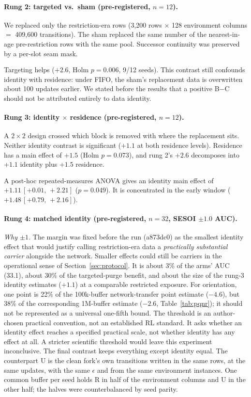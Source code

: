 \documentclass[10pt]{article} %
\newcommand{\ci}[2]{\,[#1,\,#2]}
\begin{document}
\paragraph{Rung 2: targeted vs.\ sham (pre-registered, $n=12$).}
We replaced only the restriction-era rows (3{,}200 rows $\times$ 128 environment columns $=$ 409{,}600 transitions). The sham replaced the same number of the nearest-in-age pre-restriction rows with the same pool. Successor continuity was preserved by a per-slot seam mask.

Targeting helps ($+2.6$, Holm $p=0.006$, 9/12 seeds). This contrast still confounds identity with residence: under FIFO, the sham's replacement data is overwritten about 100 updates earlier. We stated before the results that a positive B$-$C should not be attributed entirely to data identity.

\paragraph{Rung 3: identity $\times$ residence (pre-registered, $n=12$).}
A $2\times2$ design crossed which block is removed with where the replacement sits. Neither identity contrast is significant ($+1.1$ at both residence levels). Residence has a main effect of $+1.5$ (Holm $p=0.073$), and rung 2's $+2.6$ decomposes into $+1.1$ identity plus $+1.5$ residence.

A post-hoc repeated-measures ANOVA gives an identity main effect of $+1.11\ci{+0.01}{+2.21}$ ($p=0.049$). It is concentrated in the early window ($+1.48\ci{+0.79}{+2.16}$).

\paragraph{Rung 4: matched identity (pre-registered, $n=32$, SESOI $\pm1.0$ AUC).}
\emph{Why $\pm1$.} The margin was fixed before the run (a873dc0) as the smallest identity effect that would justify calling restriction-era data a \emph{practically substantial carrier} alongside the network. Smaller effects could still be carriers in the operational sense of Section~\ref{sec:protocol}. It is about 3\% of the arms' AUC (33.1), about 30\% of the targeted-purge benefit, and about the size of the rung-3 identity estimates ($+1.1$) at a comparable restricted exposure. For orientation, one point is 22\% of the 100k-buffer network-transfer point estimate ($-4.6$), but 38\% of the corresponding 1M-buffer estimate ($-2.6$, Table~\ref{tab:pqnr}); it should not be represented as a universal one-fifth bound. The threshold is an author-chosen practical convention, not an established RL standard. It asks whether an identity effect reaches a specified practical scale, not whether identity has any effect at all. A stricter scientific threshold would leave this experiment inconclusive.
The final contrast keeps everything except identity equal. The counterpart U is the clean fork's own transitions written in the same rows, at the same updates, with the same $\epsilon$ and from the same environment instances. One common buffer per seed holds R in half of the environment columns and U in the other half; the halves were counterbalanced by seed parity.
\end{document}
